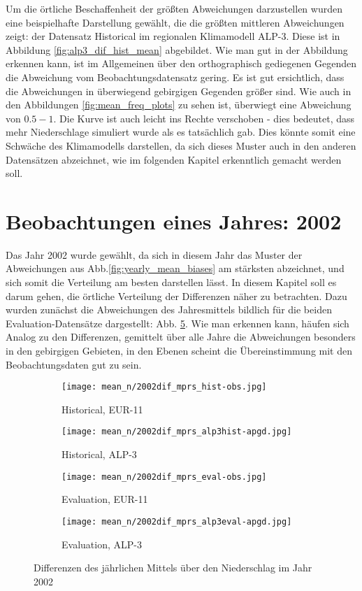 Um die örtliche Beschaffenheit der größten Abweichungen darzustellen wurden eine beispielhafte Darstellung gewählt, die die größten mittleren Abweichungen zeigt: der Datensatz Historical im regionalen Klimamodell ALP-3. Diese ist in Abbildung \ref{fig:alp3_dif_hist_mean} abgebildet.
Wie man gut in der Abbildung erkennen kann, ist im Allgemeinen über den orthographisch gediegenen Gegenden die Abweichung vom Beobachtungsdatensatz gering. Es ist gut ersichtlich, dass die Abweichungen in überwiegend gebirgigen Gegenden größer sind. Wie auch in den Abbildungen \ref{fig:mean_freq_plots} zu sehen ist, überwiegt eine Abweichung von $0.5-1$. Die Kurve ist auch leicht ins Rechte verschoben - dies bedeutet, dass mehr Niederschlage simuliert wurde als es tatsächlich gab. Dies könnte somit eine Schwäche des Klimamodells darstellen, da sich dieses Muster auch in den anderen Datensätzen abzeichnet, wie im folgenden Kapitel erkenntlich gemacht werden soll. \newpage

\section{Beobachtungen eines Jahres: 2002} \label{section:2002}
Das Jahr 2002 wurde gewählt, da sich in diesem Jahr das Muster der Abweichungen aus Abb.\ref{fig:yearly_mean_biases} am stärksten abzeichnet, und sich somit die Verteilung am besten darstellen lässt. In diesem Kapitel soll es darum gehen, die örtliche Verteilung der Differenzen näher zu betrachten. Dazu wurden zunächst die Abweichungen des Jahresmittels bildlich für die beiden Evaluation-Datensätze dargestellt: Abb. \ref{fig:dif_mean_2002}. Wie man erkennen kann, häufen sich Analog zu den Differenzen, gemittelt über alle Jahre die Abweichungen besonders in den gebirgigen Gebieten, in den Ebenen scheint die Übereinstimmung mit den Beobachtungsdaten gut zu sein.\\
\begin{figure}[h]
		\begin{subfigure}{0.49\textwidth}
			\texttt{[image: mean\_n/2002dif\_mprs\_hist-obs.jpg]}
			\caption{Historical, EUR-11}
			\label{fig:dif_mean_2002:eur11_hist}
		\end{subfigure}
		\begin{subfigure}{0.49\textwidth}
			\texttt{[image: mean\_n/2002dif\_mprs\_alp3hist-apgd.jpg]}
			\caption{Historical, ALP-3}
			\label{fig:dif_mean_2002:alp3_hist}
		\end{subfigure}
		\begin{subfigure}{0.45\textwidth}
			\texttt{[image: mean\_n/2002dif\_mprs\_eval-obs.jpg]}
			\caption{Evaluation, EUR-11}
			\label{fig:dif_mean_2002:eur11_eval}
		\end{subfigure}
		\begin{subfigure}{0.45\textwidth}
			\texttt{[image: mean\_n/2002dif\_mprs\_alp3eval-apgd.jpg]}
			\caption{Evaluation, ALP-3}
			\label{fig:dif_mean_2002:alp3_eval}
		\end{subfigure}
	\caption{Differenzen des jährlichen Mittels über den Niederschlag im Jahr 2002}
	\label{fig:dif_mean_2002}
\end{figure}

